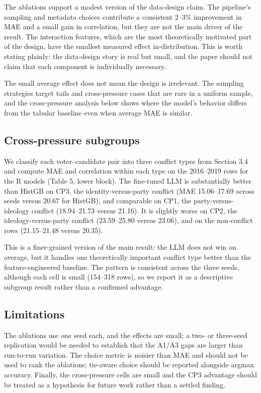 The ablations support a modest version of the data-design claim. The
pipeline's sampling and metadata choices contribute a consistent 2--3\%
improvement in MAE and a small gain in correlation, but they are not the
main driver of the result. The interaction features, which are the most
theoretically motivated part of the design, have the smallest measured
effect in-distribution. This is worth stating plainly: the data-design
story is real but small, and the paper should not claim that each
component is individually necessary.

The small average effect does not mean the design is irrelevant. The
sampling strategies target tails and cross-pressure cases that are rare
in a uniform sample, and the cross-pressure analysis below shows where
the model's behavior differs from the tabular baseline even when average
MAE is similar.

\subsection{Cross-pressure subgroups}\label{cross-pressure-subgroups}

We classify each voter--candidate pair into three conflict types from
Section 3.4 and compute MAE and correlation within each type on the
2016--2019 rows for the R models (Table 5, lower block). The fine-tuned
LLM is substantially better than HistGB on CP3, the
identity-versus-party conflict (MAE 15.06--17.69 across seeds versus
20.67 for HistGB), and comparable on CP1, the party-versus-ideology
conflict (18.94--21.73 versus 21.16). It is slightly worse on CP2, the
ideology-versus-party conflict (23.59--25.80 versus 23.06), and on the
non-conflict rows (21.15--21.48 versus 20.35).

This is a finer-grained version of the main result: the LLM does not win
on average, but it handles one theoretically important conflict type
better than the feature-engineered baseline. The pattern is consistent
across the three seeds, although each cell is small (154--318 rows), so
we report it as a descriptive subgroup result rather than a confirmed
advantage.

\subsection{Limitations}\label{limitations}

The ablations use one seed each, and the effects are small; a two- or
three-seed replication would be needed to establish that the A1/A3 gaps
are larger than run-to-run variation. The choice metric is noisier than
MAE and should not be used to rank the ablations; tie-aware choice
should be reported alongside argmax accuracy. Finally, the
cross-pressure cells are small and the CP3 advantage should be treated
as a hypothesis for future work rather than a settled finding.

